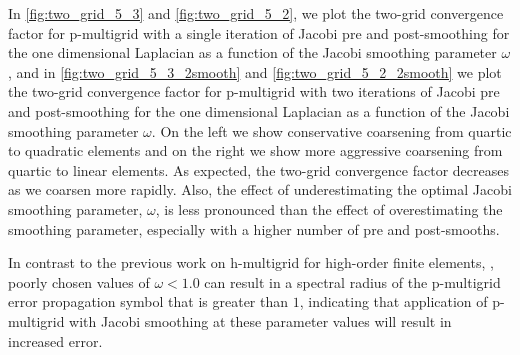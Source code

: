 \documentclass[review]{siamart190516}
\begin{document}
In \cref{fig:two_grid_5_3} and \cref{fig:two_grid_5_2}, we plot the two-grid convergence factor for p-multigrid with a single iteration of Jacobi pre and post-smoothing for the one dimensional Laplacian as a function of the Jacobi smoothing parameter $\omega$,
and in \cref{fig:two_grid_5_3_2smooth} and \cref{fig:two_grid_5_2_2smooth} we plot the two-grid convergence factor for p-multigrid with two iterations of Jacobi pre and post-smoothing for the one dimensional Laplacian as a function of the Jacobi smoothing parameter $\omega$.
On the left we show conservative coarsening from quartic to quadratic elements and on the right we show more aggressive coarsening from quartic to linear elements.
As expected, the two-grid convergence factor decreases as we coarsen more rapidly.
Also, the effect of underestimating the optimal Jacobi smoothing parameter, $\omega$, is less pronounced than the effect of overestimating the smoothing parameter, especially with a higher number of pre and post-smooths.

In contrast to the previous work on h-multigrid for high-order finite elements, \cite{he2020two}, poorly chosen values of $\omega < 1.0$ can result in a spectral radius of the p-multigrid error propagation symbol that is greater than $1$, indicating that application of p-multigrid with Jacobi smoothing at these parameter values will result in increased error.
\end{document}
